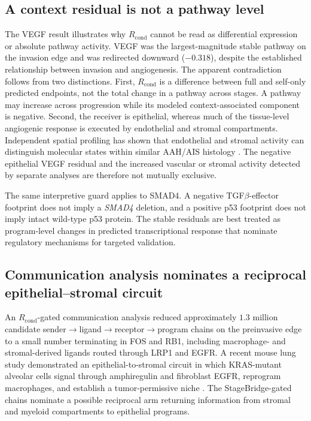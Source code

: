 \subsection{A context residual is not a pathway level}

The VEGF result illustrates why $R_{\mathrm{cond}}$ cannot be read as differential expression or absolute pathway activity. VEGF was the largest-magnitude stable pathway on the invasion edge and was redirected downward ($-0.318$), despite the established relationship between invasion and angiogenesis. The apparent contradiction follows from two distinctions. First, $R_{\mathrm{cond}}$ is a difference between full and self-only predicted endpoints, not the total change in a pathway across stages. A pathway may increase across progression while its modeled context-associated component is negative. Second, the receiver is epithelial, whereas much of the tissue-level angiogenic response is executed by endothelial and stromal compartments. Independent spatial profiling has shown that endothelial and stromal activity can distinguish molecular states within similar AAH/AIS histology \autocite{Chen2025-zo}. The negative epithelial VEGF residual and the increased vascular or stromal activity detected by separate analyses are therefore not mutually exclusive.

The same interpretive guard applies to SMAD4. A negative TGF$\beta$-effector footprint does not imply a \emph{SMAD4} deletion, and a positive p53 footprint does not imply intact wild-type p53 protein. The stable residuals are best treated as program-level changes in predicted transcriptional response that nominate regulatory mechanisms for targeted validation.

\subsection{Communication analysis nominates a reciprocal epithelial--stromal circuit}

An $R_{\mathrm{cond}}$-gated communication analysis reduced approximately $1.3$ million candidate sender$\rightarrow$ligand$\rightarrow$receptor$\rightarrow$program chains on the preinvasive edge to a small number terminating in FOS and RB1, including macrophage- and stromal-derived ligands routed through LRP1 and EGFR. A recent mouse lung study demonstrated an epithelial-to-stromal circuit in which KRAS-mutant alveolar cells signal through amphiregulin and fibroblast EGFR, reprogram macrophages, and establish a tumor-permissive niche \autocite{Cardoso2026-kp}. The StageBridge-gated chains nominate a possible reciprocal arm returning information from stromal and myeloid compartments to epithelial programs.

